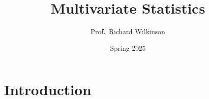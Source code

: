 \documentclass[
]{book}
\title{Multivariate Statistics}
\author{Prof.~Richard Wilkinson}
\date{Spring 2025}
\theoremstyle{definition}
\theoremstyle{definition}
\theoremstyle{definition}
\theoremstyle{definition}
\theoremstyle{remark}
\begin{document}
\maketitle

{
\setcounter{tocdepth}{1}
\tableofcontents
}
\chapter*{Introduction}\label{introduction}

\newcommand{\bmu}{{\boldsymbol{\mu}}}
\newcommand{\bSigma}{\boldsymbol{\Sigma}}
\newcommand{\bLambda}{\boldsymbol \Lambda}
\newcommand{\bgamma}{\boldsymbol \gamma}
\newcommand{\bGamma}{\boldsymbol \Gamma}
\newcommand{\btheta}{\boldsymbol \theta}
\newcommand{\bdelta}{\boldsymbol \delta}
\newcommand{\bbeta}{\boldsymbol \beta}
\newcommand{\blambda}{\boldsymbol \lambda}
\newcommand{\bepsilon}{\boldsymbol \epsilon}
\newcommand{\balpha}{\boldsymbol \alpha}

\newcommand{\bA}{\mathbf A}
\newcommand{\bB}{\mathbf B}
\newcommand{\bC}{\mathbf C}
\newcommand{\bD}{\mathbf D}
\newcommand{\bE}{\mathbf E}
\newcommand{\bF}{\mathbf F}
\newcommand{\bG}{\mathbf G}
\newcommand{\bH}{\mathbf H}
\newcommand{\bI}{\mathbf I}
\newcommand{\bL}{\mathbf L}
\newcommand{\bM}{\mathbf M}
\newcommand{\bP}{\mathbf P}
\newcommand{\bQ}{\mathbf Q}
\newcommand{\bR}{\mathbf R}
\newcommand{\mR}{\mathbb R}
\newcommand{\bS}{\mathbf S}
\newcommand{\bT}{\mathbf T}
\newcommand{\bV}{\mathbf V}
\newcommand{\bU}{\mathbf U}
\newcommand{\bW}{\mathbf W}
\newcommand{\bX}{\mathbf X}
\newcommand{\bY}{\mathbf Y}
\newcommand{\bZ}{\mathbf Z}
\newcommand{\rd}{\mathrm d}

\newcommand{\ba}{\mathbf a}
\newcommand{\bb}{\mathbf b}
\newcommand{\bc}{\mathbf c}
\newcommand{\bd}{\mathbf d}
\newcommand{\be}{\mathbf e}
\newcommand{\bg}{\mathbf g}
\newcommand{\bh}{\mathbf h}
\newcommand{\bk}{\mathbf k}
\newcommand{\bn}{\mathbf n}
\newcommand{\bp}{\mathbf p}
\newcommand{\bq}{\mathbf q}
\newcommand{\br}{\mathbf r}
\newcommand{\bt}{{\mathbf t}}
\newcommand{\bu}{\mathbf u}
\newcommand{\bv}{\mathbf v}
\newcommand{\bw}{\mathbf w}
\newcommand{\bx}{\mathbf x}
\newcommand{\by}{\mathbf y}
\newcommand{\bz}{\mathbf z}

\newcommand{\bzero}{{\boldsymbol 0}}

\newcommand{\cR}{\mathcal R}

\newcommand{\bs}{\boldsymbol}
\newcommand{\ds}{\displaystyle}
\newcommand{\tdiag}{\text{diag}}
\newcommand{\ttr}{\text{tr}}
\newcommand{\tmin}{\text{min}}
\newcommand{\tmax}{\text{max}}
\newcommand{\tdet}{\text{det}}
\newcommand{\tr}{\operatorname{tr}}
\newcommand{\indep}{\perp \!\!\! \perp}
\end{document}
